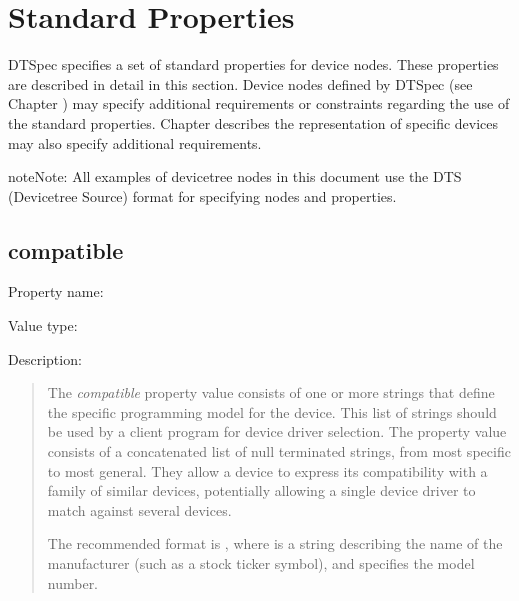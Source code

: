 \documentclass[a4paper,10pt,oneside]{sphinxmanual}
\begin{document}
\section{Standard Properties}
\label{devicetree-basics:standard-properties}\label{devicetree-basics:sect-standard-properties}
DTSpec specifies a set of standard properties for device nodes. These
properties are described in detail in this section. Device nodes defined
by DTSpec (see Chapter {\hyperref[devicenodes:chapter\string-device\string-node\string-requirements]{}}) may specify
additional requirements or constraints regarding the use of the standard
properties. Chapter {\hyperref[device\string-bindings:chapter\string-device\string-bindings]{}} describes the representation
of specific devices may also specify additional requirements.

\begin{notice}{note}{Note:}
All examples of devicetree nodes in this document use the
\textsc{DTS} (Devicetree Source) format for specifying nodes and properties.
\end{notice}


\subsection{compatible}
\label{devicetree-basics:compatible}\label{devicetree-basics:sect-standard-properties-compatible}
Property name: 

Value type: 

Description:
\begin{quote}

The \emph{compatible} property value consists of one or more strings that
define the specific programming model for the device. This list of
strings should be used by a client program for device driver selection.
The property value consists of a concatenated list of null terminated
strings, from most specific to most general. They allow a device to
express its compatibility with a family of similar devices, potentially
allowing a single device driver to match against several devices.

The recommended format is , where
 is a string describing the name of the manufacturer
(such as a stock ticker symbol), and  specifies the model
number.
\end{quote}
\end{document}
